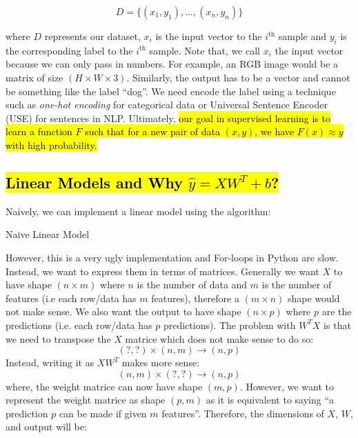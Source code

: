 \documentclass[11pt]{article}
\newcommand{\pluseq}{\mathrel{+}=}
\newcommand{\hlinfo}[1]{{\sethlcolor{lavender}\hl{#1}}}
\begin{document}
\[D= \{(x_1, y_1), ..., (x_n, y_n)\}\]

where $D$ represents our dataset, $x_i$ is the input vector to the $i^{\text{th}}$ sample and $y_i$ is the corresponding label to the $i^{\text{th}}$ sample. Note that, we call $x_i$ the input vector because we can only pass in numbers. For example, an RGB image would be a matrix of size $(H \times W \times 3)$. Similarly, the output has to be a vector and cannot be something like the label ``dog''. We need encode the label using a technique such as \emph{one-hot encoding} for categorical data or Universal Sentence Encoder (USE) for sentences in NLP. Ultimately, \hlinfo{our goal in supervised learning is to learn a function $F$ such that for a new pair of data $(x, y)$, we have $F(x) \approx y$ with high probability.}

\subsection{\hl{Linear Models and Why $\hat{y} = XW^{T} + b$?}}
\label{section:linearconvention}

Naively, we can implement a linear model using the algorithm:
\begin{algorithm}
    \caption{Naive Linear Model}
    \begin{algorithmic}[1]
            \State{$y \pluseq w_j \ast x_j$} 
        \EndFor
    \end{algorithmic}
\end{algorithm}

However, this is a very ugly implementation and For-loops in Python are slow. Instead, we want to express them in terms of matrices. Generally we want $X$ to have shape $(n \times m)$ where $n$ is the number of data and $m$ is the number of features (i.e each row/data has $m$ features), therefore a $(m \times n)$ shape would not make sense. We also want the output to have shape $(n \times p)$ where $p$ are the predictions (i.e. each row/data has $p$ predictions). The problem with $W^TX$ is that we need to transpose the $X$ matrice which does not make sense to do so:
\[(?, ?) \times (n, m) \rightarrow (n, p)\]
Instead, writing it as $XW^T$ makes more sense:
\[(n,m) \times (?,?) \rightarrow (n,p)\]
where, the weight matrice can now have shape $(m,p)$. However, we want to represent the weight matrice as shape $(p,m)$ as it is equivalent to saying ``a prediction $p$ can be made if given $m$ features''. Therefore, the dimensions of $X$, $W$, and output will be:
\end{document}
